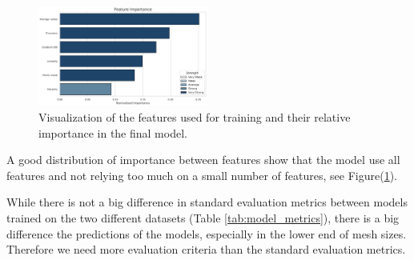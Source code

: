 \begin{figure}[htbp]
\centering
\includegraphics[width=0.5\textwidth]{figures/feature_importance_lowQ.png}
\caption{Visualization of the features used for training and their relative importance in the final model.}
\label{fig:feature_importance}
\end{figure}

A good distribution of importance between features show that the model use all features and not relying too much on a small number of features, see Figure(\ref{fig:feature_importance}).

While there is not a big difference in standard evaluation metrics between models trained on the two different datasets (Table \ref{tab:model_metrics}), there is a big difference the predictions of the models, especially in the lower end of mesh sizes. Therefore we need more evaluation criteria than the standard evaluation metrics.

